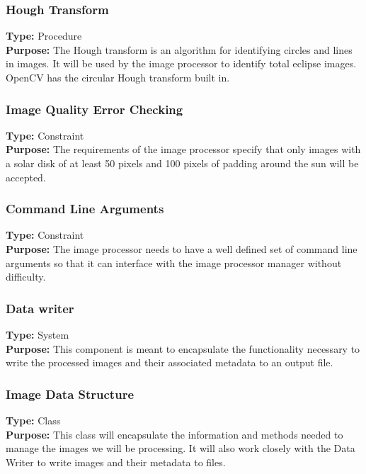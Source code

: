 \documentclass[10pt, onecolumn, draftclsnofoot, letterpaper, compsoc]{IEEEtran}
\begin{document}
\subsubsection{Hough Transform}
\textbf{Type:} Procedure\\
\textbf{Purpose:} The Hough transform is an algorithm for identifying circles
and lines in images. It will be used by the image processor to identify total
eclipse images. OpenCV has the circular Hough transform built in. \\

\subsubsection{Image Quality Error Checking}
\textbf{Type:} Constraint\\
\textbf{Purpose:} The requirements of the image processor specify that only
images with a solar disk of at least 50 pixels and 100 pixels of padding around
the sun will be accepted.\\

\subsubsection{Command Line Arguments}
\textbf{Type:} Constraint\\
\textbf{Purpose:} The image processor needs to have a well defined set of
command line arguments so that it can interface with the image processor
manager without difficulty. \\

\subsubsection{Data writer}
\textbf{Type:} System\\
\textbf{Purpose:} This component is meant to encapsulate the functionality
necessary to write the processed images and their associated metadata to an
output file.\\

\subsubsection{Image Data Structure}
\textbf{Type:} Class\\
\textbf{Purpose:} This class will encapsulate the information and methods needed
to manage the images we will be processing. It will also work closely with the
Data Writer to write images and their metadata to files.\\
\end{document}
